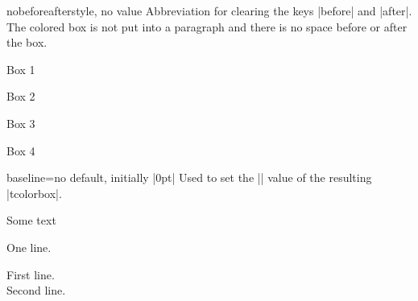 \begin{docTcbKey}{nobeforeafter}{}{style, no value}
  Abbreviation for clearing the keys |before| and |after|. The colored box
  is not put into a paragraph and there is no space before or after the box.
\begin{dispExample}
\begin{tcolorbox}[myone,title=Box 1]Box 1\end{tcolorbox}%
\begin{tcolorbox}[myone,title=Box 2]Box 2\end{tcolorbox}%
\begin{tcolorbox}[myone,title=Box 3]Box 3\end{tcolorbox}%
\begin{tcolorbox}[myone,title=Box 4]Box 4\end{tcolorbox}
\end{dispExample}
\end{docTcbKey}

\clearpage

\begin{docTcbKey}{baseline}{=}{no default, initially |0pt|}
  Used to set the |\pgfsetbaseline| value of the resulting |tcolorbox|.
\begin{dispExample}
Some text\dotfill
\begin{tcolorbox}[baseline=3mm]
One line.
\end{tcolorbox}
\begin{tcolorbox}[baseline=3mm]
First line.\\Second line.
\end{tcolorbox}
\end{dispExample}
\end{docTcbKey}



